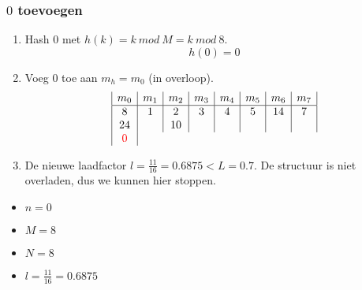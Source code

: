 \documentclass[hashing.tex]{subfiles}
\begin{document}
\subsubsection{$0$ toevoegen}
\begin{enumerate}
\item Hash $0$ met $h(k) = k\ mod\ M = k\ mod\ 8$.
\[
h(0) = 0
\]
\item Voeg $0$ toe aan $m_h = m_0$ (in overloop).
\[
\begin{array}{|c|c|c|c|c|c|c|c|}
m_0&m_1&m_2&m_3&m_4&m_5&m_6&m_7\\
\hline
8 & 1 & 2 & 3 & 4 & 5& 14&7\\
24&   & 10&  &   &&&\\
\color{red}0
\end{array} 
\]
\item De nieuwe laadfactor $l=\frac{11}{16} = 0.6875 < L = 0.7$. De structuur is niet overladen, dus we kunnen hier stoppen.
\end{enumerate}
\begin{multicols}{4}
\begin{itemize}
\item $n=0$
\item $M=8$
\item $N=8$
\item $l=\frac{11}{16} = 0.6875$
\end{itemize}
\end{multicols}
\end{document}
